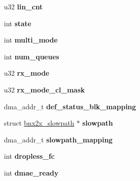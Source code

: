 \begin{DoxyCompactItemize}
\item 
\hypertarget{structbnx2x_ade19896ddba575e82ec30e2fcec753d2}{
u32 {\bfseries lin\_\-cnt}}
\label{structbnx2x_ade19896ddba575e82ec30e2fcec753d2}

\item 
\hypertarget{structbnx2x_aec92fd3a7afe5d88bf95a9db50346dea}{
int {\bfseries state}}
\label{structbnx2x_aec92fd3a7afe5d88bf95a9db50346dea}

\item 
\hypertarget{structbnx2x_aee93991a7ea2aad5b69d9b91c5096bd6}{
int {\bfseries multi\_\-mode}}
\label{structbnx2x_aee93991a7ea2aad5b69d9b91c5096bd6}

\item 
\hypertarget{structbnx2x_a26c157e67615e990c7e4b9f0ce0c68e4}{
int {\bfseries num\_\-queues}}
\label{structbnx2x_a26c157e67615e990c7e4b9f0ce0c68e4}

\item 
\hypertarget{structbnx2x_a6f540c469c06990030cb88640251ca71}{
u32 {\bfseries rx\_\-mode}}
\label{structbnx2x_a6f540c469c06990030cb88640251ca71}

\item 
\hypertarget{structbnx2x_aadc212c35e79555fd92a22c90679a8ab}{
u32 {\bfseries rx\_\-mode\_\-cl\_\-mask}}
\label{structbnx2x_aadc212c35e79555fd92a22c90679a8ab}

\item 
\hypertarget{structbnx2x_a49693b161ecf93c647f0ba16dd17988b}{
dma\_\-addr\_\-t {\bfseries def\_\-status\_\-blk\_\-mapping}}
\label{structbnx2x_a49693b161ecf93c647f0ba16dd17988b}

\item 
\hypertarget{structbnx2x_ac244d20b27fdca4b2e630991cd4032b5}{
struct \hyperlink{structbnx2x__slowpath}{bnx2x\_\-slowpath} $\ast$ {\bfseries slowpath}}
\label{structbnx2x_ac244d20b27fdca4b2e630991cd4032b5}

\item 
\hypertarget{structbnx2x_a7e85bdabdfb844611760a4b69ec073f7}{
dma\_\-addr\_\-t {\bfseries slowpath\_\-mapping}}
\label{structbnx2x_a7e85bdabdfb844611760a4b69ec073f7}

\item 
\hypertarget{structbnx2x_a73c410bab49c0a2b64555775825eb265}{
int {\bfseries dropless\_\-fc}}
\label{structbnx2x_a73c410bab49c0a2b64555775825eb265}

\item 
\hypertarget{structbnx2x_aa45677ed3fc5e6496d4121872e7503f3}{
int {\bfseries dmae\_\-ready}}
\label{structbnx2x_aa45677ed3fc5e6496d4121872e7503f3}


\end{DoxyCompactItemize}
